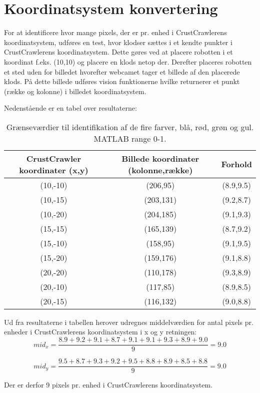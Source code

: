 \chapter{Koordinatsystem konvertering}\label{app:KoordinatsystemKonvertering}
For at identificere hvor mange pixels, der er pr. enhed i CrustCrawlerens koordinatsystem, udføres en test, hvor klodser sættes i et kendte punkter i CrustCrawlerens koordinatsystem.
Dette gøres ved at placere robotten i et koordinat f.eks. (10,10) og placere en klods netop der.
Derefter placeres robotten et sted uden for billedet hvorefter webcamet tager et billede af den placerede klods.
På dette billede udføres vision funktionerne  hvilke returnerer et punkt (række og kolonne) i billedet koordinatsystem.



Nedenstående er en tabel over resultaterne:
\begin{table}[H]
\centering
\begin{tabular}{c|c|c}
CrustCrawler koordinater (x,y)	&	Billede koordinater (kolonne,række)	& Forhold\\
\hline
(10,-10)	&	(206,95)		&	(8.9,9.5)\\
(10,-15)	&	(203,131)	&	(9.2,8.7)\\
(10,-20)	&	(204,185)	&	(9.1,9.3)\\
(15,-15)	&	(165,139)	&	(8.7,9.2)\\
(15,-10)	&	(158,95)		&	(9.1,9.5)\\
(15,-20)	&	(159,176)	&	(9.1,8.8)\\
(20,-20)	&	(110,178)	&	(9.3,8.9)\\
(20,-10)	&	(117,85)		&	(8.9,8.5)\\
(20,-15)	&	(116,132)	&	(9.0,8.8)\\
\end{tabular}	
\caption{Grænseværdier til identifikation af de fire farver, blå, rød, grøn og gul. MATLAB range 0-1.}
\end{table}

Ud fra resultaterne i tabellen herover udregnes middelværdien for antal pixels pr. enheder i CrustCrawlerens koordinatsystem i x og y retningen:
\begin{equation}
	mid_x=\frac{8.9+9.2+9.1+8.7+9.1+9.1+9.3+8.9+9.0}{9}=9.0
\end{equation}

\begin{equation}
	mid_y=\frac{9.5+8.7+9.3+9.2+9.5+8.8+8.9+8.5+8.8}{9}=9.0
\end{equation}

Der er derfor 9 pixels pr. enhed i CrustCrawlerens koordinatsystem.